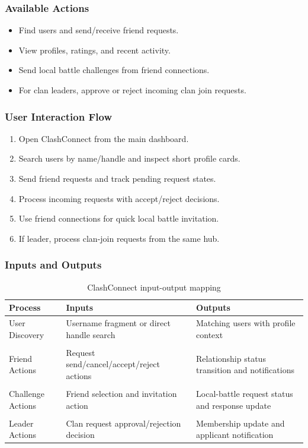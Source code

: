 \documentclass[12pt]{article}
\begin{document}
\subsubsection{Available Actions}

\begin{itemize}
\item Find users and send/receive friend requests.
\item View profiles, ratings, and recent activity.
\item Send local battle challenges from friend connections.
\item For clan leaders, approve or reject incoming clan join requests.
\end{itemize}

\subsubsection{User Interaction Flow}

\begin{enumerate}
\item Open ClashConnect from the main dashboard.
\item Search users by name/handle and inspect short profile cards.
\item Send friend requests and track pending request states.
\item Process incoming requests with accept/reject decisions.
\item Use friend connections for quick local battle invitation.
\item If leader, process clan-join requests from the same hub.
\end{enumerate}

\subsubsection{Inputs and Outputs}

\begin{table}[ht]
\centering
\begin{tabularx}{\textwidth}{>{\raggedright\arraybackslash}p{3.2cm} >{\raggedright\arraybackslash}X >{\raggedright\arraybackslash}X}
\toprule
\textbf{Process} & \textbf{Inputs} & \textbf{Outputs} \\
\midrule
User Discovery & Username fragment or direct handle search & Matching users with profile context \\ \\
Friend Actions & Request send/cancel/accept/reject actions & Relationship status transition and notifications \\ \\
Challenge Actions & Friend selection and invitation action & Local-battle request status and response update \\ \\
Leader Actions & Clan request approval/rejection decision & Membership update and applicant notification \\
\bottomrule
\end{tabularx}
\caption{ClashConnect input-output mapping}
\end{table}
\end{document}
